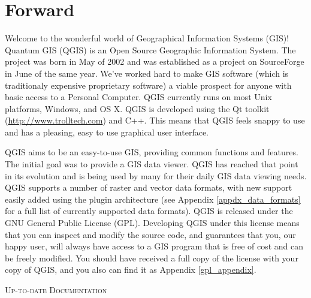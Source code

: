 
\section{Forward}\label{label_forward}
\setcounter{page}{1}

\updatedisclaimer

Welcome to the wonderful world of Geographical Information Systems (GIS)!
Quantum GIS (QGIS) is an Open Source Geographic Information System. The project
was born in May of 2002 and was established as a project on SourceForge in June
of the same year. We've worked hard to make GIS software (which is traditionaly
expensive proprietary software) a viable prospect for anyone with basic access
to a Personal Computer. QGIS currently runs on most Unix platforms, Windows, and
OS X. QGIS is developed using the Qt toolkit (\url{http://www.trolltech.com})
and C++. This means that QGIS feels snappy to use and has a pleasing, easy to
use graphical user interface. 

QGIS aims to be an easy-to-use GIS, providing common functions and features.
The initial goal was to provide a GIS data viewer. QGIS has reached that point
in its evolution and is being used by many for their daily GIS data viewing
needs. QGIS supports a number of raster and vector data formats, with new
support easily added using the plugin architecture (see Appendix
\ref{appdx_data_formats} for a full list of currently supported data formats).
QGIS is released under the GNU General Public License (GPL). Developing QGIS 
under this license means that you can inspect and modify the source code,
and guarantees that you, our happy user, will always have access to a GIS
program that is free of cost and can be freely modified. You should have
received a full copy of the license with your copy of QGIS, and you also can
find it as Appendix \ref{gpl_appendix}.  

\begin{Tip}\caption{\textsc{Up-to-date Documentation}}
\end{Tip}

